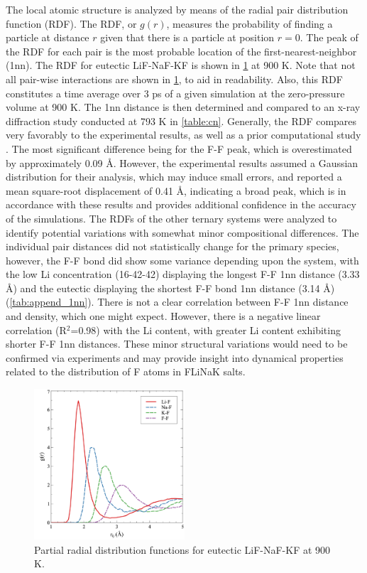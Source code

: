 \documentclass[preprint,12pt]{elsarticle}
\begin{document}
The local atomic structure is analyzed by means of the radial pair distribution function (RDF). The RDF, or $g(r)$, measures the probability of finding a particle at distance $r$ given that there is a particle at position $r=0$. The peak of the RDF for each pair is the most probable location of the first-nearest-neighbor (1nn). The RDF for eutectic LiF-NaF-KF is shown in \cref{fig:rdf} at 900 K. Note that not all pair-wise interactions are shown in \cref{fig:rdf}, to aid in readability. Also, this RDF constitutes a time average over 3 ps of a given simulation at the zero-pressure volume at 900 K. The 1nn distance is then determined and compared to an x-ray diffraction study conducted at 793 K in \cref{table:cn}. Generally, the RDF compares very favorably to the experimental results, as well as a prior computational study \cite{Frandsen2020}. The most significant difference being for the F-F peak, which is overestimated by approximately 0.09 \AA. However, the experimental results assumed a Gaussian distribution for their analysis, which may induce small errors, and reported a mean square-root displacement of 0.41 {\AA}, indicating a broad peak, which is in accordance with these results and provides additional confidence in the accuracy of the simulations. The RDFs of the other ternary systems were analyzed to identify potential variations with somewhat minor compositional differences. The individual pair distances did not statistically change for the primary species, however, the F-F bond did show some variance depending upon the system, with the low Li concentration (16-42-42) displaying the longest F-F 1nn distance (3.33 \AA) and the eutectic displaying the shortest F-F bond 1nn distance (3.14 \AA) (\cref{tab:append_1nn}). There is not a clear correlation between F-F 1nn distance and density, which one might expect. However, there is a negative linear correlation (R$^2$=0.98) with the Li content, with greater Li content exhibiting shorter F-F 1nn distances. These minor structural variations would need to be confirmed via experiments and may provide insight into dynamical properties related to the distribution of F atoms in FLiNaK salts. 

\begin{figure}[!ht]
    \centering
    \includegraphics[width=0.5\textwidth]{final_rdf.jpg}
    \caption{Partial radial distribution functions for eutectic LiF-NaF-KF at 900 K.}
    \label{fig:rdf}
\end{figure}
\end{document}
